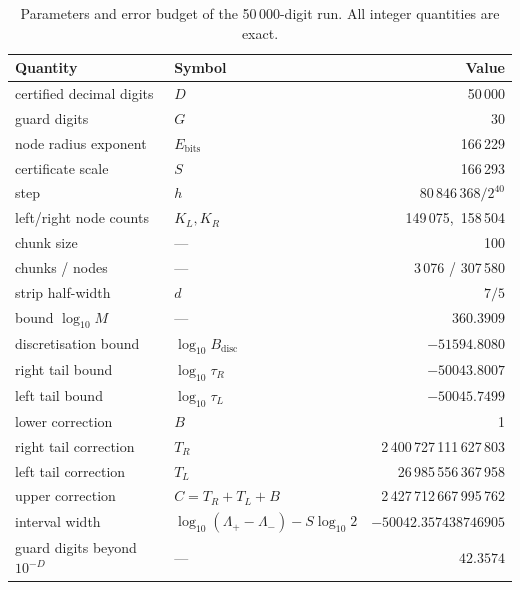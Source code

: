 \documentclass[11pt,a4paper]{article}
\theoremstyle{remark}
\begin{document}
\begin{table}[ht]
\centering
\small
\begin{tabular}{@{}llr@{}}
\toprule
Quantity & Symbol & Value \\
\midrule
certified decimal digits        & $D$              & 50\,000 \\
guard digits                    & $G$              & 30 \\
node radius exponent            & $E_{\mathrm{bits}}$ & 166\,229 \\
certificate scale               & $S$              & 166\,293 \\
step                            & $h$              & $80\,846\,368/2^{40}$ \\
left/right node counts          & $K_L,K_R$        & 149\,075,\ 158\,504 \\
chunk size                      & ---              & 100 \\
chunks / nodes                  & ---              & 3\,076 / 307\,580 \\
\midrule
strip half-width                & $d$              & $7/5$ \\
bound $\log_{10}M$              & ---              & $360.3909$ \\
discretisation bound            & $\log_{10}B_{\mathrm{disc}}$ & $-51594.8080$ \\
right tail bound                & $\log_{10}\tau_R$ & $-50043.8007$ \\
left tail bound                 & $\log_{10}\tau_L$ & $-50045.7499$ \\
\midrule
lower correction                & $B$              & 1 \\
right tail correction           & $T_R$            & 2\,400\,727\,111\,627\,803 \\
left tail correction            & $T_L$            & 26\,985\,556\,367\,958 \\
upper correction                & $C=T_R+T_L+B$    & 2\,427\,712\,667\,995\,762 \\
\midrule
interval width                  & $\log_{10}(\Lambda_+-\Lambda_-)-S\log_{10}2$ & $-50042.357438746905$ \\
guard digits beyond $10^{-D}$   & ---              & $42.3574$ \\
\bottomrule
\end{tabular}
\caption{Parameters and error budget of the 50\,000-digit run. All
integer quantities are exact.}
\label{tab:params}
\end{table}
\end{document}
